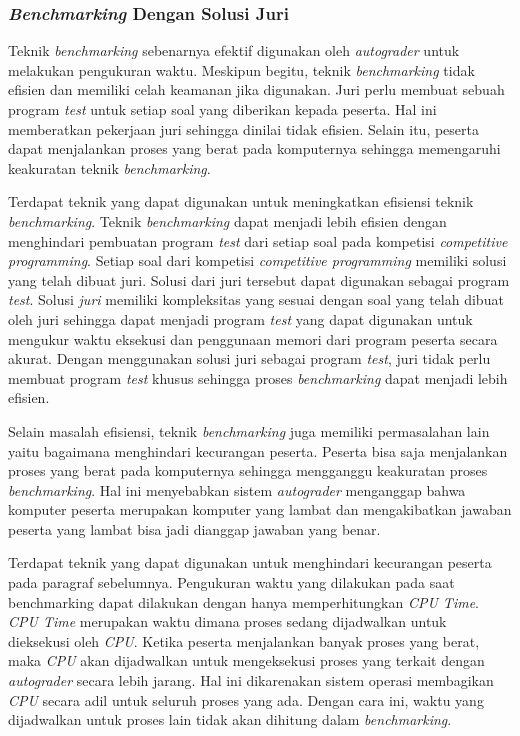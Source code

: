\subsubsection{\textit{Benchmarking} Dengan Solusi Juri} \label{subsec:time-memory-measure-compare-with-jury}

\par Teknik \textit{benchmarking} sebenarnya efektif digunakan oleh \textit{autograder} untuk melakukan pengukuran waktu. Meskipun begitu, teknik \textit{benchmarking} tidak efisien dan memiliki celah keamanan jika digunakan. Juri perlu membuat sebuah program \textit{test} untuk setiap soal yang diberikan kepada peserta. Hal ini memberatkan pekerjaan juri sehingga dinilai tidak efisien. Selain itu, peserta dapat menjalankan proses yang berat pada komputernya sehingga memengaruhi keakuratan teknik \textit{benchmarking}.

\par Terdapat teknik yang dapat digunakan untuk meningkatkan efisiensi teknik \textit{benchmarking}. Teknik \textit{benchmarking} dapat menjadi lebih efisien dengan menghindari pembuatan program \textit{test} dari setiap soal pada kompetisi \textit{competitive programming}. Setiap soal dari kompetisi \textit{competitive programming} memiliki solusi yang telah dibuat juri. Solusi dari juri tersebut dapat digunakan sebagai program \textit{test}. Solusi \textit{juri} memiliki kompleksitas yang sesuai dengan soal yang telah dibuat oleh juri sehingga dapat menjadi program \textit{test} yang dapat digunakan untuk mengukur waktu eksekusi dan penggunaan memori dari program peserta secara akurat. Dengan menggunakan solusi juri sebagai program \textit{test}, juri tidak perlu membuat program \textit{test} khusus sehingga proses \textit{benchmarking} dapat menjadi lebih efisien.

\par Selain masalah efisiensi, teknik \textit{benchmarking} juga memiliki permasalahan lain yaitu bagaimana menghindari kecurangan peserta. Peserta bisa saja menjalankan proses yang berat pada komputernya sehingga mengganggu keakuratan proses \textit{benchmarking}. Hal ini menyebabkan sistem \textit{autograder} menganggap bahwa komputer peserta merupakan komputer yang lambat dan mengakibatkan jawaban peserta yang lambat bisa jadi dianggap jawaban yang benar.

\par Terdapat teknik yang dapat digunakan untuk menghindari kecurangan peserta pada paragraf sebelumnya. Pengukuran waktu yang dilakukan pada saat benchmarking dapat dilakukan dengan hanya memperhitungkan \textit{CPU Time}. \textit{CPU Time} merupakan waktu dimana proses sedang dijadwalkan untuk dieksekusi oleh \textit{CPU}. Ketika peserta menjalankan banyak proses yang berat, maka \textit{CPU} akan dijadwalkan untuk mengeksekusi proses yang terkait dengan \textit{autograder} secara lebih jarang. Hal ini dikarenakan sistem operasi membagikan \textit{CPU} secara adil untuk seluruh proses yang ada. Dengan cara ini, waktu yang dijadwalkan untuk proses lain tidak akan dihitung dalam \textit{benchmarking}.

